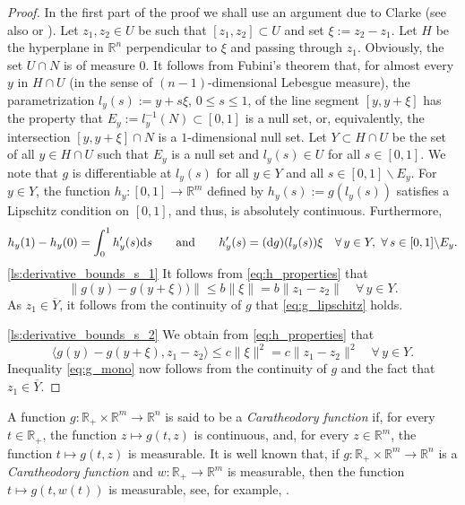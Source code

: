 \documentclass[a4paper,11pt]{article}
\newcommand{\R}{\mathbb R}
\numberwithin{equation}{section}
\numberwithin{figure}{section}
\numberwithin{table}{section}
\begin{document}
\begin{proof}
In the first part of the proof we shall use an argument due to Clarke \cite{c76} (see also \cite[Proof of Lemma 2, p. 254]{c90} or \cite[Proof of Proposition 3.11, Chapter 3]{clsw98}).
Let $z_1,z_2\in U$ be such that $[z_1,z_2]\subset U$ and set $\xi:=z_2-z_1$. Let $H$ be the hyperplane in $\R^n$ perpendicular to $\xi$ and passing through $z_1$. Obviously, the set $U\cap N$ is of measure $0$. It follows from Fubini's theorem that, for almost every $y$ in $H\cap U$ (in the sense of $(n-1)$-dimensional Lebesgue
measure), the parametrization $l_y(s):=y+s\xi$, $0\leq s\leq 1$, of the line segment $[y,y+\xi]$ has the property that $E_y:=l_y^{-1}(N)\subset[0,1]$ is a null set, or, equivalently, the
intersection $[y,y+\xi]\cap N$ is a $1$-dimensional null set.
Let $Y\subset H\cap U$ be the set of all $y\in H\cap U$ such that $E_y$ is a null set and
$l_y(s)\in U$ for all $s\in [0,1]$. We note that $g$ is differentiable at $l_y(s)$ for all
$y\in Y$ and all $s\in[0,1]\backslash E_y$.
For $y\in Y$, the function $h_y:[0,1]\to\R^m$ defined by $h_y(s):=g(l_y(s))$
satisfies a Lipschitz condition on $[0,1]$, and thus, is absolutely continuous. Furthermore,
\begin{equation}\label{eq:h_properties}
h_y(1)-h_y(0)=\int_0^1h_y'(s){\rm d}s\qquad\mbox{and}\qquad h_y'(s)=({\rm d}g)(l_y(s))\xi\quad\forall\,y\in Y,\,\,\forall\,s\in[0,1]\backslash E_y.
\end{equation}
\ref{ls:derivative_bounds_s_1} It follows from \eqref{eq:h_properties} that
\[
\|g(y)-g(y+\xi))\|\leq b\|\xi\|=b\|z_1-z_2\|\quad\forall\,y\in Y.
\]
As $z_1\in\overline{Y}$, it follows from the continuity of $g$ that \eqref{eq:g_lipschitz} holds.

\ref{ls:derivative_bounds_s_2} We obtain from \eqref{eq:h_properties} that
\[
\langle g(y)-g(y+\xi),z_1-z_2\rangle\leq c\|\xi\|^2=c\|z_1-z_2\|^2\quad\forall\,y\in Y.
\]
Inequality \eqref{eq:g_mono} now follows from the continuity of $g$ and the fact that  $z_1\in\overline{Y}$.
\end{proof}
%
A function $g:\R_+\times\R^m\to\R^n$ is said to be a {\it Caratheodory function} if, for every $t\in \R_+$, the function $z\mapsto g(t,z)$ is continuous, and, for every $z\in\R^m$, the function $t\mapsto g(t,z)$ is measurable. It is well known that, if $g:\R_+\times\R^m\to\R^n$  is a {\it Caratheodory function} and $w:\R_+\to\R^m$ is measurable, then the function $t\mapsto g(t,w(t))$ is measurable,
see, for example, \cite[Lemma 8.2.3]{af09}.
\end{document}
